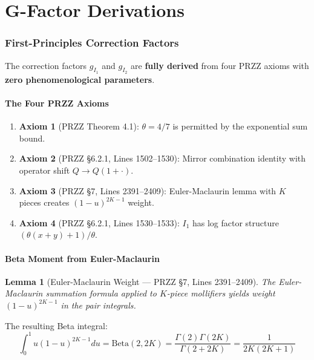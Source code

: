 \documentclass[11pt]{article}
\newtheorem{lemma}{Lemma}
\begin{document}

\part{G-Factor Derivations}

\section{First-Principles Correction Factors}
\label{sec:gfactors}

The correction factors $g_{I_1}$ and $g_{I_2}$ are \textbf{fully derived} from four PRZZ axioms with \textbf{zero phenomenological parameters}.

\subsection{The Four PRZZ Axioms}

\begin{enumerate}
\item \textbf{Axiom 1} (PRZZ Theorem 4.1): $\theta = 4/7$ is permitted by the exponential sum bound.
\item \textbf{Axiom 2} (PRZZ \S6.2.1, Lines 1502--1530): Mirror combination identity with operator shift $Q \to Q(1+\cdot)$.
\item \textbf{Axiom 3} (PRZZ \S7, Lines 2391--2409): Euler-Maclaurin lemma with $K$ pieces creates $(1-u)^{2K-1}$ weight.
\item \textbf{Axiom 4} (PRZZ \S6.2.1, Lines 1530--1533): $I_1$ has log factor structure $(\theta(x+y)+1)/\theta$.
\end{enumerate}

\subsection{Beta Moment from Euler-Maclaurin}

\begin{lemma}[Euler-Maclaurin Weight --- PRZZ \S7, Lines 2391--2409]
The Euler-Maclaurin summation formula applied to $K$-piece mollifiers yields weight $(1-u)^{2K-1}$ in the pair integrals.
\end{lemma}

The resulting Beta integral:
\begin{equation}
\int_0^1 u(1-u)^{2K-1} du = \text{Beta}(2, 2K) = \frac{\Gamma(2)\Gamma(2K)}{\Gamma(2+2K)} = \frac{1}{2K(2K+1)}
\end{equation}
\end{document}
